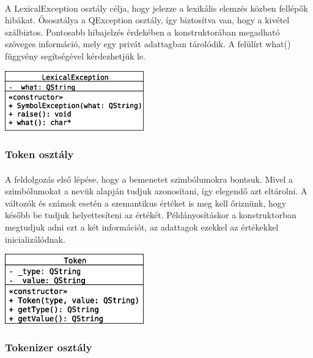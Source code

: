 \documentclass[12pt]{report}
\begin{document}
\paragraph{}
A LexicalException osztály célja, hogy jelezze a lexikális elemzés közben fellépők hibákat. Ősosztálya a QException osztály, így biztosítva van, hogy a kivétel szálbiztos. Pontosabb hibajelzés érdekében a konstruktorában megadható szöveges információ, mely egy privát adattagban tárolódik. A felülírt what() függvény segítségével kérdezhetjük le.
\begin{center}
\includegraphics[width=6cm]{pics/uml/LexicalException}
\end{center}
\subsubsection{Token osztály}
\paragraph{}
A feldolgozás első lépése, hogy a bemenetet szimbólumokra bontsuk. Mivel a szimbólumokat a nevük alapján tudjuk azonosítani, így elegendő azt eltárolni. A változók és számok esetén a szemantikus értéket is meg kell őriznünk, hogy később be tudjuk helyettesíteni az értékét. Példányosításkor a konstruktorban megtudjuk adni ezt a két információt, az adattagok ezekkel az értékekkel inicializálódnak.
\begin{center}
\includegraphics[width=6cm]{pics/uml/Token}
\end{center}
\subsubsection{Tokenizer osztály}
\end{document}
